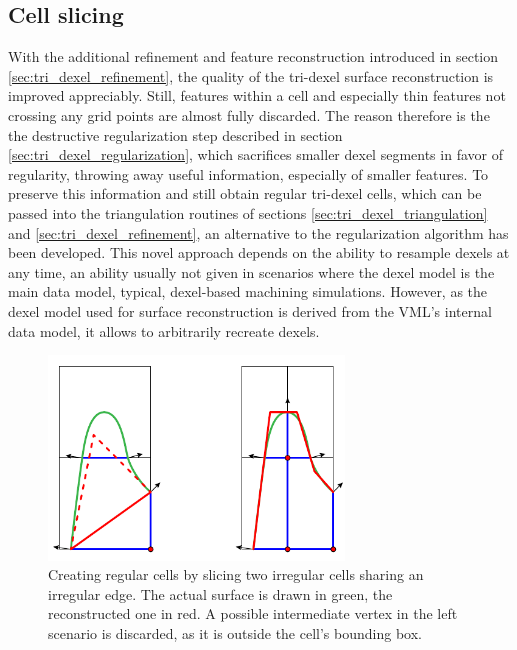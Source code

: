 \subsection{Cell slicing}
\label{sec:tri_dexel_cellslicing}

With the additional refinement and feature reconstruction introduced in section \ref{sec:tri_dexel_refinement}, the quality of the tri-dexel surface reconstruction is improved appreciably.
Still, features within a cell and especially thin features not crossing any grid points are almost fully discarded.
The reason therefore is the the destructive regularization step described in section \ref{sec:tri_dexel_regularization}, which sacrifices smaller dexel segments in favor of regularity, throwing away useful information, especially of smaller features.
To preserve this information and still obtain regular tri-dexel cells, which can be passed into the triangulation routines of sections \ref{sec:tri_dexel_triangulation} and \ref{sec:tri_dexel_refinement}, an alternative to the regularization algorithm has been developed.
This novel approach depends on the ability to resample dexels at any time, an ability usually not given in scenarios where the dexel model is the main data model, \ie typical, dexel-based machining simulations.
However, as the dexel model used for surface reconstruction is derived from the VML's internal data model, it allows to arbitrarily recreate dexels.

\begin{figure}
	\centering
	\includegraphics[width=0.7\textwidth]{images/tri_dexel_cellslicing}
	\caption{
		Creating regular cells by slicing two irregular cells sharing an irregular edge.
		The actual surface is drawn in green, the reconstructed one in red.
		A possible intermediate vertex in the left scenario is discarded, as it is outside the cell's bounding box.
	}
	\label{fig:tri_dexel_cellslicing}
\end{figure}

